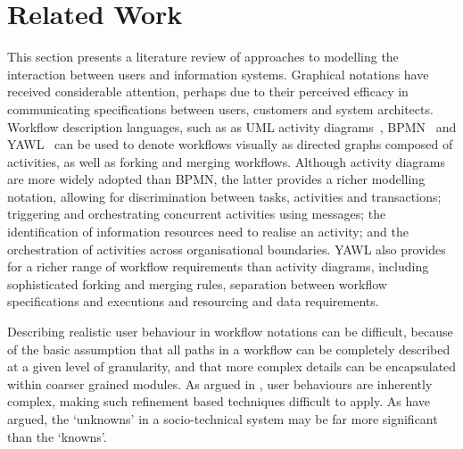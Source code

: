 \documentclass{llncs}
\begin{document}

\section{Related Work}
\label{sec:related}


This section presents a literature review of approaches to modelling the interaction between users and information
systems.  Graphical notations have received considerable attention, perhaps due to their perceived efficacy in
communicating specifications between users, customers and system architects.  Workflow description languages, such as as
UML activity diagrams~\citep{omg07omguml}, BPMN~\citep{omg2011omgbpmn} and YAWL~\citep{hofstede2010yawl} can be used to
denote workflows visually as directed graphs composed of activities, as well as
forking and merging workflows.  Although activity diagrams are more widely
adopted than BPMN, the latter provides a richer modelling notation, allowing for discrimination between tasks, activities and transactions; triggering and
orchestrating concurrent activities using messages; the identification of information resources need to realise an
activity; and the orchestration of activities across organisational boundaries. YAWL also provides for a richer range of
workflow requirements than activity diagrams, including sophisticated forking and merging rules, separation between
workflow specifications and executions and resourcing and data requirements.

Describing realistic user behaviour in workflow notations can be difficult, because of the basic assumption that all
paths in a workflow can be completely described at a given level of granularity, and that more complex details can be
encapsulated within coarser grained modules.  As argued in , user behaviours are
inherently complex, making such refinement based techniques difficult to apply.  As
\citet{israilidis13ignorance} have argued, the `unknowns' in a socio-technical system may be far more significant than
the `knowns'. 
\end{document}
